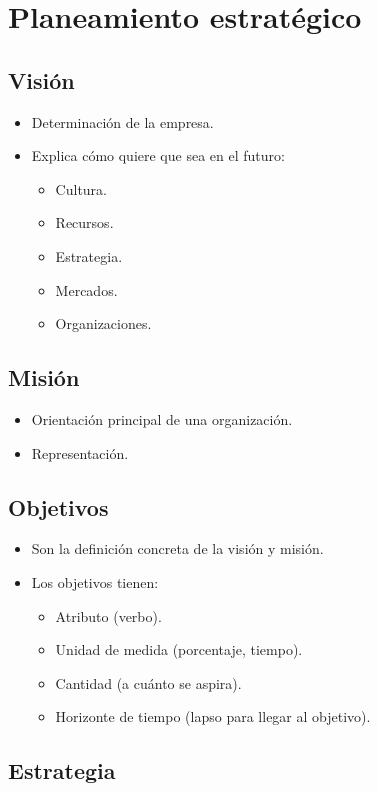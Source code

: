 \documentclass[spanish, twocolumn, twoside,openany]{book}
\begin{document}
\chapter{Planeamiento estratégico}

\section{Visión}
	\begin{itemize}
		\item Determinación de la empresa.
		\item Explica cómo quiere que sea en el futuro:
		\begin{itemize}
			\item Cultura.
			\item Recursos.
			\item Estrategia.
			\item Mercados.
			\item Organizaciones.
		\end{itemize}
	\end{itemize}

\section{Misión}
\begin{itemize}
	\item Orientación principal de una organización.
	\item Representación.
\end{itemize}

\section{Objetivos}
\begin{itemize}
	\item Son la definición concreta de la visión y misión.
	\item Los objetivos tienen:
	\begin{itemize}
		\item Atributo (verbo).
		\item Unidad de medida (porcentaje, tiempo).
		\item Cantidad (a cuánto se aspira).
		\item Horizonte de tiempo (lapso para llegar al objetivo).
	\end{itemize}
\end{itemize}

\section{Estrategia}
\end{document}
